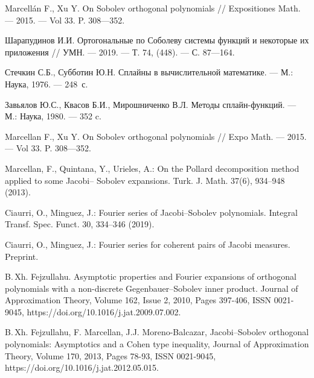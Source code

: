 \begin{thebibliography}{111}


  Marcellán F., Xu Y. On Sobolev orthogonal polynomials // Expositiones Math. --- 2015. --- Vol 33. P. 308---352.

  Шарапудинов И.И. Ортогональные по Соболеву системы функций и некоторые их приложения // УМН. --- 2019. --- Т. 74, (448). --- С. 87---164.

  Стечкин С.Б., Субботин Ю.Н.
  Сплайны в вычислительной математике.
  --- М.: Наука,
  1976. --- 248~с.

  Завьялов Ю.С., Квасов Б.И., Мирошниченко В.Л.
  Методы сплайн-функций.
  --- М.: Наука,
  1980.
  --- 352 c.
  
	Marcellan F., Xu Y. On Sobolev orthogonal polynomials // Expo Math. --- 2015. --- Vol 33. P. 308---352.
	
	
	
	
	Marcellan, F., Quintana, Y., Urieles, A.: On the Pollard decomposition method applied to some Jacobi–
	Sobolev expansions. Turk. J. Math. 37(6), 934–948 (2013).
	
	
	
	
	Ciaurri, O., Minguez, J.: Fourier series of Jacobi–Sobolev polynomials. Integral Transf. Spec. Funct.
	30, 334–346 (2019).
	
	
	
	
	Ciaurri, O., Minguez, J.: Fourier series for coherent pairs of Jacobi measures. Preprint.
	
	
	
	
	B.\,Xh. Fejzullahu. Asymptotic properties and Fourier expansions of orthogonal polynomials with a non-discrete Gegenbauer–Sobolev inner product. Journal of Approximation Theory, Volume 162, Issue 2, 2010, Pages 397-406, ISSN 0021-9045, https://doi.org/10.1016/j.jat.2009.07.002.
	
	
	
	
	B.\,Xh. Fejzullahu, F. Marcellan, J.J. Moreno-Balcazar, Jacobi–Sobolev orthogonal polynomials: Asymptotics and a Cohen type inequality, Journal of Approximation Theory,
	Volume 170, 2013, Pages 78-93, ISSN 0021-9045, https://doi.org/10.1016/j.jat.2012.05.015.
	

\end{thebibliography}
